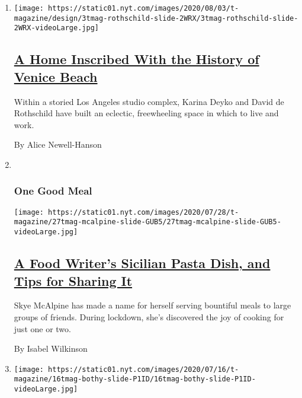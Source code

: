 \begin{enumerate}
\def\labelenumi{\arabic{enumi}.}
\item
  \texttt{[image: https://static01.nyt.com/images/2020/08/03/t-magazine/design/3tmag-rothschild-slide-2WRX/3tmag-rothschild-slide-2WRX-videoLarge.jpg]}

  \hypertarget{a-home-inscribed-with-the-history-of-venice-beach}{%
  \subsection{\texorpdfstring{\href{/2020/08/03/t-magazine/david-de-rothschild-venice-home-design.html}{A
  Home Inscribed With the History of Venice
  Beach}}{A Home Inscribed With the History of Venice Beach}}\label{a-home-inscribed-with-the-history-of-venice-beach}}

  Within a storied Los Angeles studio complex, Karina Deyko and David de
  Rothschild have built an eclectic, freewheeling space in which to live
  and work.

  By Alice Newell-Hanson
\item ~
  \hypertarget{one-good-meal}{%
  \subsubsection{One Good Meal}\label{one-good-meal}}

  \texttt{[image: https://static01.nyt.com/images/2020/07/28/t-magazine/27tmag-mcalpine-slide-GUB5/27tmag-mcalpine-slide-GUB5-videoLarge.jpg]}

  \hypertarget{a-food-writers-sicilian-pasta-dish-and-tips-for-sharing-it}{%
  \subsection{\texorpdfstring{\href{/2020/07/29/t-magazine/skye-mcalpine-pasta-cooking.html}{A
  Food Writer's Sicilian Pasta Dish, and Tips for Sharing
  It}}{A Food Writer's Sicilian Pasta Dish, and Tips for Sharing It}}\label{a-food-writers-sicilian-pasta-dish-and-tips-for-sharing-it}}

  Skye McAlpine has made a name for herself serving bountiful meals to
  large groups of friends. During lockdown, she's discovered the joy of
  cooking for just one or two.

  By Isabel Wilkinson
\item
  \texttt{[image: https://static01.nyt.com/images/2020/07/16/t-magazine/16tmag-bothy-slide-P1ID/16tmag-bothy-slide-P1ID-videoLarge.jpg]}


\end{enumerate}

